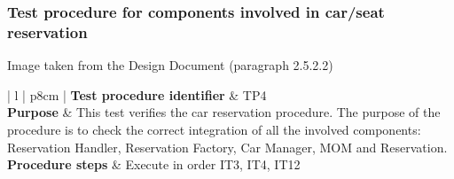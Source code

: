 \documentclass{article}
\begin{document}
			\subsubsection{Test procedure for components involved in car/seat reservation} \label{sec:3.2.4}
				\begin{minipage}{\linewidth}
				\end{minipage}
				\begin{center}
					Image taken from the Design Document (paragraph 2.5.2.2)
				\end{center}
				\begin{center}
					\setlength{\tabcolsep}{24pt}
					\renewcommand{\arraystretch}{1.4}
					\begin{tabular}{ | l | p{8cm} |}\hline
						\textbf{Test procedure identifier} & TP4\\\hline
						\textbf{Purpose} & This test verifies the car reservation procedure. The purpose of the procedure is to check the correct integration of all the involved components: Reservation Handler, Reservation Factory, Car Manager, MOM and Reservation. \\\hline
						\textbf{Procedure steps} & Execute in order IT3, IT4, IT12 \\\hline
					\end{tabular}
				\end{center}
				\pagebreak
				\begin{minipage}{\linewidth}
				\end{minipage}
\end{document}
